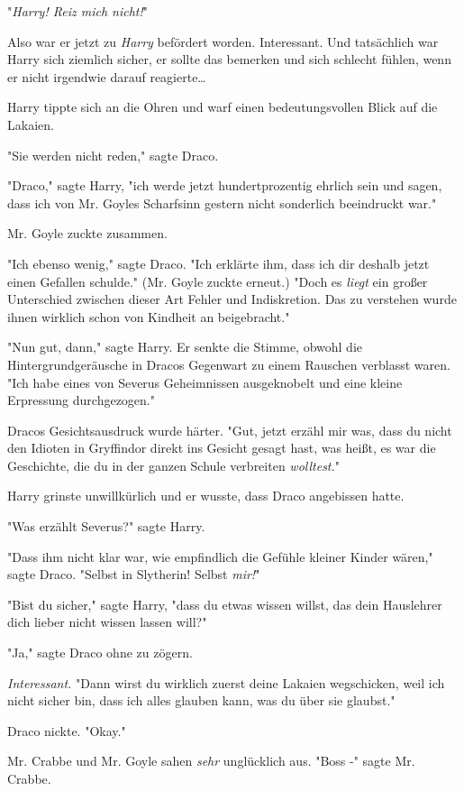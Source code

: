 {"\emph{Harry! Reiz mich nicht!}"

Also war er jetzt zu \emph{Harry} befördert worden. Interessant. Und tatsächlich war Harry sich ziemlich sicher, er sollte das bemerken und sich schlecht fühlen, wenn er nicht irgendwie darauf reagierte…

Harry tippte sich an die Ohren und warf einen bedeutungsvollen Blick auf die Lakaien.

"Sie werden nicht reden," sagte Draco.

"Draco," sagte Harry, "ich werde jetzt hundertprozentig ehrlich sein und sagen, dass ich von Mr. Goyles Scharfsinn gestern nicht sonderlich beeindruckt war."

Mr. Goyle zuckte zusammen.

"Ich ebenso wenig," sagte Draco. "Ich erklärte ihm, dass ich dir deshalb jetzt einen Gefallen schulde." (Mr. Goyle zuckte erneut.) "Doch es \emph{liegt} ein großer Unterschied zwischen dieser Art Fehler und Indiskretion. Das zu verstehen wurde ihnen wirklich schon von Kindheit an beigebracht."

"Nun gut, dann," sagte Harry. Er senkte die Stimme, obwohl die Hintergrundgeräusche in Dracos Gegenwart zu einem Rauschen verblasst waren. "Ich habe eines von Severus Geheimnissen ausgeknobelt und eine kleine Erpressung durchgezogen."

Dracos Gesichtsausdruck wurde härter. "Gut, jetzt erzähl mir was, dass du nicht den Idioten in Gryffindor direkt ins Gesicht gesagt hast, was heißt, es war die Geschichte, die du in der ganzen Schule verbreiten \emph{wolltest.}"

Harry grinste unwillkürlich und er wusste, dass Draco angebissen hatte.

"Was erzählt Severus?" sagte Harry.

"Dass ihm nicht klar war, wie empfindlich die Gefühle kleiner Kinder wären," sagte Draco. "Selbst in Slytherin! Selbst \emph{mir!}"

"Bist du sicher," sagte Harry, "dass du etwas wissen willst, das dein Hauslehrer dich lieber nicht wissen lassen will?"

"Ja," sagte Draco ohne zu zögern.

\emph{Interessant.} "Dann wirst du wirklich zuerst deine Lakaien wegschicken, weil ich nicht sicher bin, dass ich alles glauben kann, was du über sie glaubst."

Draco nickte. "Okay."

Mr. Crabbe und Mr. Goyle sahen \emph{sehr} unglücklich aus. "Boss -" sagte Mr. Crabbe.

}
